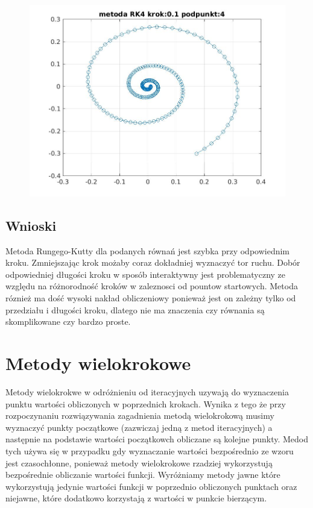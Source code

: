 \documentclass[a4paper, 12pt]{article}
\begin{document}
\begin{figure}[H]
\centering
\includegraphics[width = 15cm]{2d/metoda RK4 krok:0,1 podpunkt:4.jpg}
\end{figure}

\subsection{Wnioski}
Metoda Rungego-Kutty dla podanych równań jest szybka przy odpowiednim kroku. Zmniejszając krok możaby coraz dokładniej wyznaczyć tor ruchu. Dobór odpowiedniej długości kroku w sposób interaktywny jest problematyczny ze względu na różnorodność kroków w zaleznosci od pountow startowych. Metoda róznież ma dość wysoki nakład obliczeniowy ponieważ jest on zależny tylko od przedziału i długości kroku, dlatego nie ma znaczenia czy równania są skomplikowane czy bardzo proste. 

\section{Metody wielokrokowe}
Metody wielokrokwe w odróżnieniu od iteracyjnych uzywają do wyznaczenia punktu wartości obliczonych w poprzednich krokach. Wynika z tego że przy rozpoczynaniu rozwiązywania zagadnienia metodą wielokrokową musimy wyznaczyć punkty początkowe (zazwiczaj jedną z metod iteracyjnych) a następnie na podstawie wartości początkowch obliczane są kolejne punkty. Medod tych używa się w przypadku gdy wyznaczanie wartości bezpośrednio ze wzoru jest czasochłonne, ponieważ metody wielokrokowe rzadziej wykorzystują bezpośrednie obliczanie wartości funkcji. Wyróżniamy metody jawne które wykorzystują jedynie wartości funkcji w poprzednio obliczonych punktach oraz niejawne, które dodatkowo korzystają z wartości w punkcie bierzącym. 
\end{document}
